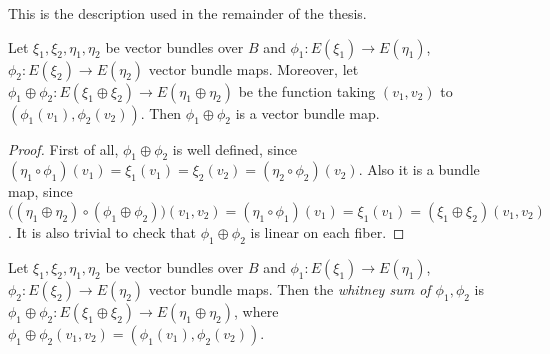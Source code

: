 This is the description used in the remainder of the thesis.
\begin{proposition} Let $\xi_1,\xi_2,\eta_1,\eta_2$ be vector bundles over $B$ and $\phi_1:E(\xi_1)\to E(\eta_1)$, $\phi_2:E(\xi_2)\to E(\eta_2)$ vector bundle maps. Moreover, let $\phi_1\oplus\phi_2:E(\xi_1\oplus\xi_2)\to E(\eta_1\oplus\eta_2)$ be the function taking $(v_1,v_2)$ to $(\phi_1(v_1),\phi_2(v_2))$. Then $\phi_1\oplus\phi_2$ is a vector bundle map.
\end{proposition}
\begin{proof} First of all, $\phi_1\oplus\phi_2$ is well defined, since $(\eta_1\circ\phi_1)(v_1)=\xi_1(v_1)=\xi_2(v_2)=(\eta_2\circ\phi_2)(v_2)$. Also it is a bundle map, since $\big((\eta_1\oplus\eta_2)\circ(\phi_1\oplus\phi_2)\big)(v_1,v_2)=(\eta_1\circ\phi_1)(v_1)=\xi_1(v_1)=(\xi_1\oplus\xi_2)(v_1,v_2)$. It is also trivial to check that $\phi_1\oplus\phi_2$ is linear on each fiber.
\end{proof}
\begin{definition}\label{def:wh_sum_map} Let $\xi_1,\xi_2,\eta_1,\eta_2$ be vector bundles over $B$ and $\phi_1:E(\xi_1)\to E(\eta_1)$, $\phi_2:E(\xi_2)\to E(\eta_2)$ vector bundle maps. Then the \emph{whitney sum of $\phi_1,\phi_2$} is $\phi_1\oplus\phi_2:E(\xi_1\oplus\xi_2)\to E(\eta_1\oplus\eta_2)$, where $\phi_1\oplus\phi_2(v_1,v_2)=(\phi_1(v_1),\phi_2(v_2))$.
\end{definition}

